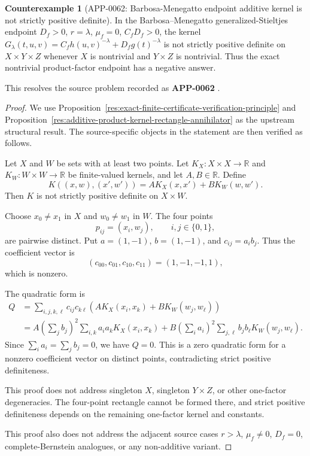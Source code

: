 \documentclass[11pt]{article}
\numberwithin{equation}{section}
\theoremstyle{definition}
\newtheorem{counterexample}[theorem]{Counterexample}
\theoremstyle{remark}
\newcommand{\1}{\mathbf 1}
\begin{document}
\begin{counterexample}[APP-0062: Barbosa-Menegatto endpoint additive kernel is not strictly positive definite]
\label{res:barbosamenegatto-endpoint-additive-rectangle-not-spd}
In the Barbosa--Menegatto generalized-Stieltjes endpoint \(D_f>0\), \(r=\lambda\), \(\mu_f=0\), \(C_fD_f>0\), the kernel \(G_\lambda(t,u,v)=C_fh(u,v)^{-\lambda}+D_fg(t)^{-\lambda}\) is not strictly positive definite on \(X\times Y\times Z\) whenever \(X\) is nontrivial and \(Y\times Z\) is nontrivial. Thus the exact nontrivial product-factor endpoint has a negative answer.



This resolves the source problem recorded as \textbf{APP-0062} \cite{app-app-0062-source}.
\end{counterexample}

\begin{proof}
We use Proposition~\ref{res:exact-finite-certificate-verification-principle} and Proposition~\ref{res:additive-product-kernel-rectangle-annihilator} as the upstream structural result. The source-specific objects in the statement are then verified as follows.

Let \(X\) and \(W\) be sets with at least two points. Let \(K_X\colon X\times X\to\mathbb R\) and \(K_W\colon W\times W\to\mathbb R\) be finite-valued kernels, and let \(A,B\in\mathbb R\). Define
\[
K((x,w),(x',w'))=A K_X(x,x')+B K_W(w,w').
\]
Then \(K\) is not strictly positive definite on \(X\times W\).

Choose \(x_0\ne x_1\) in \(X\) and \(w_0\ne w_1\) in \(W\). The four points
\[
p_{ij}=(x_i,w_j),\qquad i,j\in\{0,1\},
\]
are pairwise distinct. Put \(a=(1,-1)\), \(b=(1,-1)\), and \(c_{ij}=a_i b_j\). Thus the coefficient vector is
\[
(c_{00},c_{01},c_{10},c_{11})=(1,-1,-1,1),
\]
which is nonzero.

The quadratic form is
\[
\begin{aligned}
Q
&=\sum_{i,j,k,\ell} c_{ij}c_{k\ell}
\left(AK_X(x_i,x_k)+BK_W(w_j,w_\ell)\right)\\
&=A\left(\sum_j b_j\right)^2\sum_{i,k}a_i a_kK_X(x_i,x_k)
+B\left(\sum_i a_i\right)^2\sum_{j,\ell}b_j b_\ell K_W(w_j,w_\ell).
\end{aligned}
\]
Since \(\sum_i a_i=\sum_j b_j=0\), we have \(Q=0\). This is a zero quadratic form for a nonzero coefficient vector on distinct points, contradicting strict positive definiteness.

This proof does not address singleton \(X\), singleton \(Y\times Z\), or other one-factor degeneracies. The four-point rectangle cannot be formed there, and strict positive definiteness depends on the remaining one-factor kernel and constants.

This proof also does not address the adjacent source cases \(r>\lambda\), \(\mu_f\ne0\), \(D_f=0\), complete-Bernstein analogues, or any non-additive variant.
\end{proof}
\end{document}
